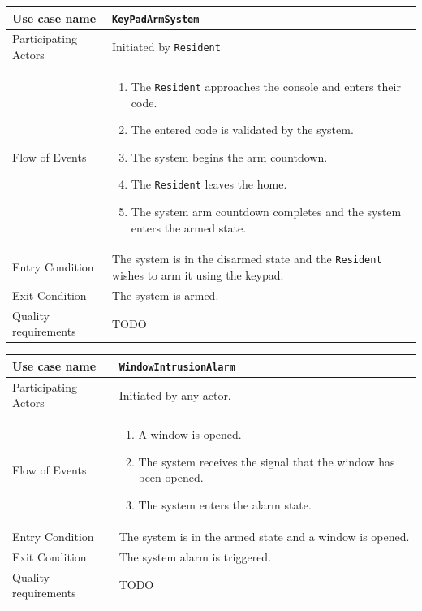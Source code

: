 \documentclass{report}
\begin{document}
\begin{tabular}{| l | p{7cm} |}
\hline
Use case name & \texttt{KeyPadArmSystem} \\ \hline
Participating Actors & Initiated by \texttt{Resident} \\ \hline
Flow of Events & 

\begin{enumerate}
 \item The \texttt{Resident} approaches the console and enters their code.
 \item The entered code is validated by the system.
 \item The system begins the arm countdown.
 \item The \texttt{Resident} leaves the home.
 \item The system arm countdown completes and the system enters the armed state.
\end{enumerate}

\\ \hline

Entry Condition & The system is in the disarmed state and the \texttt{Resident}
    wishes to arm it using the keypad. \\ \hline
Exit Condition & The system is armed. \\ \hline
Quality requirements & TODO \\ \hline

\hline
\end{tabular}

\begin{tabular}{| l | p{7cm} |}
\hline
Use case name & \texttt{WindowIntrusionAlarm} \\ \hline
Participating Actors & Initiated by any actor. \\ \hline
Flow of Events & 

\begin{enumerate}
 \item A window is opened.
 \item The system receives the signal that the window has been opened.
 \item The system enters the alarm state.
\end{enumerate}

\\ \hline

Entry Condition & The system is in the armed state and a window is opened. \\ 
\hline
Exit Condition & The system alarm is triggered. \\ \hline
Quality requirements & TODO \\ \hline

\hline
\end{tabular}
\end{document}
